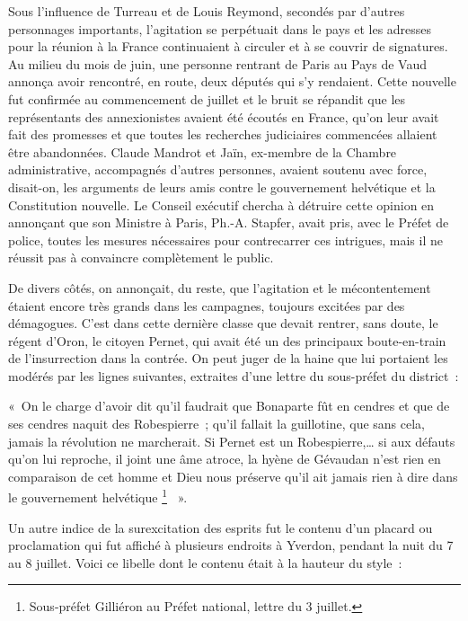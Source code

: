 \documentclass[french,twoside]{book} %
\newenvironment{quoteblock}%
  {\begin{quoting}}
  {\end{quoting}}
\newenvironment{quotebar}{%
    \def\FrameCommand{{\color{rubric!10!}\vrule width 0.5em} \hspace{0.9em}}%
    \def\OuterFrameSep{\itemsep} %
    \MakeFramed {\advance\hsize-\width \FrameRestore}
  }%
  {%
    \endMakeFramed
  }
\renewenvironment{quoteblock}%
  {%
    \savenotes
    \setstretch{0.9}
    \normalfont
    \begin{quotebar}
  }
  {%
    \end{quotebar}
    \spewnotes
  }
\begin{document}
\noindent Sous l’influence de Turreau et de Louis Reymond, secondés par d’autres personnages importants, l’agitation se perpétuait dans le pays et les adresses pour la réunion à la France continuaient à circuler et à se couvrir de signatures. Au milieu du mois de juin, une personne rentrant de Paris au Pays de Vaud annonça avoir rencontré, en route, deux députés qui s’y rendaient. Cette nouvelle fut confirmée au commencement de juillet et le bruit se répandit que les représentants des annexionistes avaient été écoutés en France, qu’on leur avait fait des promesses et que toutes les recherches judiciaires commencées allaient être abandonnées. Claude Mandrot et Jaïn, ex-membre de la Chambre administrative, accompagnés d’autres personnes, avaient soutenu avec force, disait-on, les arguments de leurs amis contre le gouvernement helvétique et la Constitution nouvelle. Le Conseil exécutif chercha à détruire cette opinion en annonçant que son Ministre à Paris, Ph.-A. Stapfer, avait pris, avec le Préfet de police, toutes les mesures nécessaires pour contrecarrer ces intrigues, mais il ne réussit pas à convaincre complètement le public.\par
De divers côtés, on annonçait, du reste, que l’agitation et le mécontentement étaient encore très grands dans les campagnes, toujours excitées par des démagogues. C’est dans cette dernière classe que devait rentrer, sans doute, le régent d’Oron, le citoyen Pernet, qui avait été un des principaux boute-en-train de l’insurrection dans la contrée. On peut juger de la haine que lui portaient les modérés par les lignes suivantes, extraites d’une lettre du sous-préfet du district :\par

\begin{quoteblock}
 \noindent  « On le charge d’avoir dit qu’il faudrait que Bonaparte fût en cendres et que de ses cendres naquit des Robespierre ; qu’il fallait la guillotine, que sans cela, jamais la révolution ne marcherait. Si Pernet est un Robespierre,… si aux défauts qu’on lui reproche, il joint une âme atroce, la hyène de Gévaudan n’est rien en comparaison de cet homme et Dieu nous préserve qu’il ait jamais rien à dire dans le gouvernement helvétique \footnote{Sous-préfet Gilliéron au Préfet national, lettre du 3 juillet.}  ».
 \end{quoteblock}

\noindent Un autre indice de la surexcitation des esprits fut le contenu d’un placard ou proclamation qui fut affiché à plusieurs endroits à Yverdon, pendant la nuit du 7 au 8 juillet. Voici ce libelle dont le contenu était à la hauteur du style :\par
\end{document}
